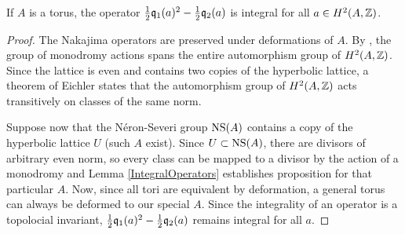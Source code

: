 \begin{corollary} \label{IntegralOperatorsTorus}
If $A$ is a torus, the operator $\frac{1}{2}\mathfrak{q}_1(a)^2 - \frac{1}{2}\mathfrak{q}_2(a)$ is integral for all $a\in H^2(A,\mathbb{Z})$. 
\end{corollary}
\begin{proof}
The Nakajima operators are preserved under deformations of $A$. 
By \cite[Thm.~II]{Shioda}, the group of monodromy actions spans the entire automorphism group of $H^2(A,\mathbb{Z})$.
Since the lattice is even and contains two copies of the hyperbolic lattice, a theorem of Eichler \cite[Prop.~3.7.3]{Scattone} states that the automorphism group of $H^2(A,\mathbb{Z})$ acts transitively on classes of the same norm. 

Suppose now that the N\'eron-Severi group $\operatorname{NS}(A)$ contains a copy of the hyperbolic lattice $U$ (such $A$ exist).
Since $U\subset \operatorname{NS}(A)$, there are divisors of arbitrary even norm,
so every class can be mapped to a divisor by the action of a monodromy and Lemma \ref{IntegralOperators} establishes proposition for that particular $A$. 
Now, since all tori are equivalent by deformation, a general torus can always be deformed to our special $A$. Since the integrality of an operator is a topolocial invariant, $\frac{1}{2}\mathfrak{q}_1(a)^2 - \frac{1}{2}\mathfrak{q}_2(a)$ remains integral for all $a$.
\end{proof}

